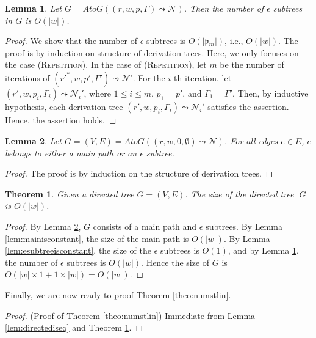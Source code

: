 \documentclass[conference]{IEEEtran}
\newtheorem{theorem}{Theorem}[section]
\newtheorem{lemma}{Lemma}[section]
\newcommand{\togform}{{\mathit AtoG}}
\newcommand{\path}{\mathfrak{p}}
\begin{document}
\begin{lemma}
\label{lem:numofesubtreeisw}
Let $G = \togform{}((r,w,p,\Gamma)\leadsto{}\mathcal{N})$.
Then the number of $\epsilon$ subtrees in $G$ is $O(|w|)$.
\end{lemma}
\begin{proof}
We show that the number of $\epsilon$ subtrees is $O(|\path{}_m|)$, i.e., $O(|w|)$.
The proof is by induction on structure of derivation trees.
Here, we only focuses on the case (\textsc{Repetition}).
In the case of (\textsc{Repetition}), 
let $m$ be the number of iterations of $({r'}^*,w,p',\Gamma') \leadsto{} \mathcal{N}'$.
For the $i$-th iteration, let $(r', w, p_i, \Gamma_i) \leadsto{} \mathcal{N}_i'$, where $1 \leq i \leq m$, $p_1 = p'$, and $\Gamma_1 = \Gamma'$.
Then, by inductive hypothesis, each derivation tree $(r', w, p_i, \Gamma_i) \leadsto{} \mathcal{N}_i'$ satisfies the assertion.
Hence, the assertion holds.
\end{proof}





\begin{lemma}
\label{lem:belongstomore}
Let $G = (V,E) = \togform{}((r, w, 0, \emptyset{}) \leadsto{} \mathcal{N})$.
For all edges $e \in E$, $e$ belongs to either a main path or an $\epsilon$ subtree.
\end{lemma}
\begin{proof}
The proof is by induction on the structure of derivation trees.
\end{proof}

\begin{theorem}
\label{theo:main}
Given a directed tree $G = (V,E)$.
The size of the directed tree $|G|$ is $O(|w|)$.
\end{theorem}
\begin{proof}
By Lemma \ref{lem:belongstomore}, $G$ consists of a main path and $\epsilon$ subtrees.
By Lemma \ref{lem:mainisconstant}, the size of the main path is $O(|w|)$.
By Lemma \ref{lem:esubtreeisconstant}, the size of the $\epsilon$ subtrees is $O(1)$, and by Lemma \ref{lem:numofesubtreeisw}, the number of $\epsilon$ subtrees is $O(|w|)$.
Hence the size of $G$ is $O(|w| \times 1 + 1 \times |w|) = O(|w|)$.
\end{proof}

Finally, we are now ready to proof Theorem \ref{theo:numstlin}.

\begin{proof}{(Proof of Theorem \ref{theo:numstlin})}
Immediate from Lemma \ref{lem:directediseq} and Theorem \ref{theo:main}.
\end{proof}
\end{document}
